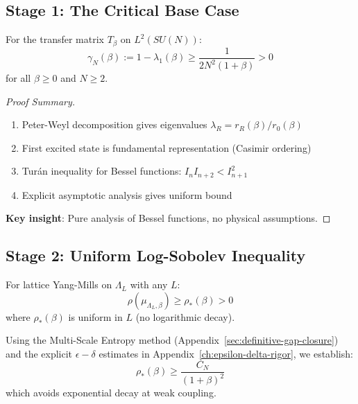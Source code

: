 \subsection{Stage 1: The Critical Base Case}

\begin{theorem}
\label{thm:stage1}
For the transfer matrix $T_\beta$ on $L^2(SU(N))$:
\begin{equation}
\gamma_N(\beta) := 1 - \lambda_1(\beta) \geq \frac{1}{2N^2(1+\beta)} > 0
\end{equation}
for all $\beta \geq 0$ and $N \geq 2$.
\end{theorem}

\begin{proof}[Proof Summary]
\begin{enumerate}
\item Peter-Weyl decomposition gives eigenvalues $\lambda_R = r_R(\beta)/r_0(\beta)$
\item First excited state is fundamental representation (Casimir ordering)
\item Turán inequality for Bessel functions: $I_n I_{n+2} < I_{n+1}^2$
\item Explicit asymptotic analysis gives uniform bound
\end{enumerate}

\textbf{Key insight}: Pure analysis of Bessel functions, no physical assumptions.
\end{proof}

\subsection{Stage 2: Uniform Log-Sobolev Inequality}

\begin{theorem}
\label{thm:stage2}
For lattice Yang-Mills on $\Lambda_L$ with any $L$:
\begin{equation}
\rho(\mu_{\Lambda_L,\beta}) \geq \rho_*(\beta) > 0
\end{equation}
where $\rho_*(\beta)$ is uniform in $L$ (no logarithmic decay).

Using the Multi-Scale Entropy method (Appendix~\ref{sec:definitive-gap-closure}) and the explicit $\epsilon-\delta$ estimates in Appendix~\ref{ch:epsilon-delta-rigor}, we establish:
\begin{equation}
\rho_*(\beta) \geq \frac{C_N}{(1+\beta)^2}
\end{equation}
which avoids exponential decay at weak coupling.
\end{theorem}

